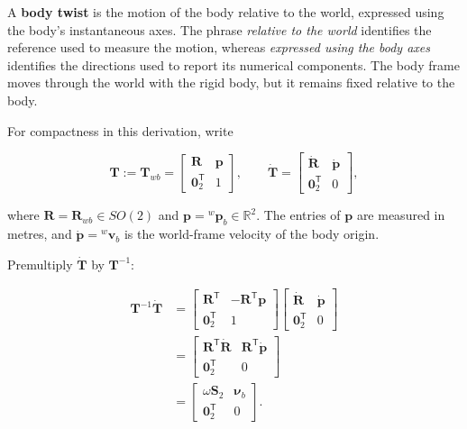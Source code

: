 \documentclass[
  australian,
  12pt,
  letterpaper,
  DIV=11,
  numbers=noendperiod,
  twoside]{scrreprt}
\begin{document}
A \textbf{body twist} is the motion of the body relative to the world,
expressed using the body's instantaneous axes. The phrase \emph{relative
to the world} identifies the reference used to measure the motion,
whereas \emph{expressed using the body axes} identifies the directions
used to report its numerical components. The body frame moves through
the world with the rigid body, but it remains fixed relative to the
body.

For compactness in this derivation, write

\[
\mathbf T
\mathrel{:=}
\mathbf T_{wb}
=
\begin{bmatrix}
\mathbf R&\mathbf p\\
\mathbf 0_2^\mathsf T&1
\end{bmatrix},
\qquad
\dot{\mathbf T}
=
\begin{bmatrix}
\dot{\mathbf R}&\dot{\mathbf p}\\
\mathbf 0_2^\mathsf T&0
\end{bmatrix},
\]

where \(\mathbf R=\mathbf R_{wb}\in SO(2)\) and
\(\mathbf p={}^w\mathbf p_b\in\mathbb R^2\). The entries of
\(\mathbf p\) are measured in metres, and
\(\dot{\mathbf p}={}^w\mathbf v_b\) is the world-frame velocity of the
body origin.

Premultiply \(\dot{\mathbf T}\) by \(\mathbf T^{-1}\):

\[
\begin{aligned}
\mathbf T^{-1}\dot{\mathbf T}
&=
\begin{bmatrix}
\mathbf R^\mathsf T&-\mathbf R^\mathsf T\mathbf p\\
\mathbf 0_2^\mathsf T&1
\end{bmatrix}
\begin{bmatrix}
\dot{\mathbf R}&\dot{\mathbf p}\\
\mathbf 0_2^\mathsf T&0
\end{bmatrix}\\
&=
\begin{bmatrix}
\mathbf R^\mathsf T\dot{\mathbf R}&
\mathbf R^\mathsf T\dot{\mathbf p}\\
\mathbf 0_2^\mathsf T&0
\end{bmatrix}\\
&=
\begin{bmatrix}
\omega\mathbf S_2&\boldsymbol\nu_b\\
\mathbf 0_2^\mathsf T&0
\end{bmatrix}.
\end{aligned}
\]
\end{document}
